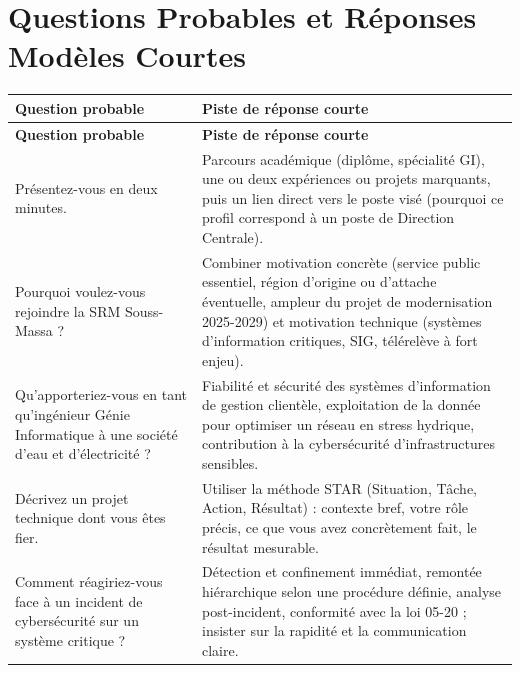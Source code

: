 \section{Questions Probables et Réponses Modèles Courtes}

{\small
\begin{longtable}{|>{\raggedright\arraybackslash\hspace{0pt}}p{5.2cm}|>{\raggedright\arraybackslash\hspace{0pt}}p{8.8cm}|}
\hline
\rowcolor{gray!20} \textbf{Question probable} & \textbf{Piste de réponse courte} \\ \hline
\endfirsthead
\hline
\rowcolor{gray!20} \textbf{Question probable} & \textbf{Piste de réponse courte} \\ \hline
\endhead

Présentez-vous en deux minutes. & Parcours académique (diplôme, spécialité GI), une ou deux expériences ou projets marquants, puis un lien direct vers le poste visé (pourquoi ce profil correspond à un poste de Direction Centrale). \\ \hline

Pourquoi voulez-vous rejoindre la SRM Souss-Massa ? & Combiner motivation concrète (service public essentiel, région d'origine ou d'attache éventuelle, ampleur du projet de modernisation 2025-2029) et motivation technique (systèmes d'information critiques, SIG, télérelève à fort enjeu). \\ \hline

Qu'apporteriez-vous en tant qu'ingénieur Génie Informatique à une société d'eau et d'électricité ? & Fiabilité et sécurité des systèmes d'information de gestion clientèle, exploitation de la donnée pour optimiser un réseau en stress hydrique, contribution à la cybersécurité d'infrastructures sensibles. \\ \hline

Décrivez un projet technique dont vous êtes fier. & Utiliser la méthode STAR (Situation, Tâche, Action, Résultat) : contexte bref, votre rôle précis, ce que vous avez concrètement fait, le résultat mesurable. \\ \hline

Comment réagiriez-vous face à un incident de cybersécurité sur un système critique ? & Détection et confinement immédiat, remontée hiérarchique selon une procédure définie, analyse post-incident, conformité avec la loi 05-20 ; insister sur la rapidité et la communication claire. \\ \hline


\end{longtable}}
